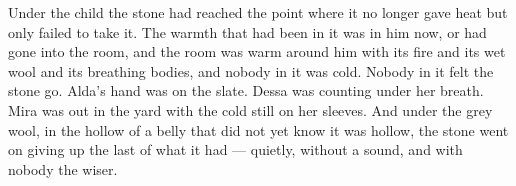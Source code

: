 Under the child the stone had reached the point where it no longer gave heat but only failed to take it. The warmth that had been in it was in him now, or had gone into the room, and the room was warm around him with its fire and its wet wool and its breathing bodies, and nobody in it was cold. Nobody in it felt the stone go. Alda's hand was on the slate. Dessa was counting under her breath. Mira was out in the yard with the cold still on her sleeves. And under the grey wool, in the hollow of a belly that did not yet know it was hollow, the stone went on giving up the last of what it had --- quietly, without a sound, and with nobody the wiser.
